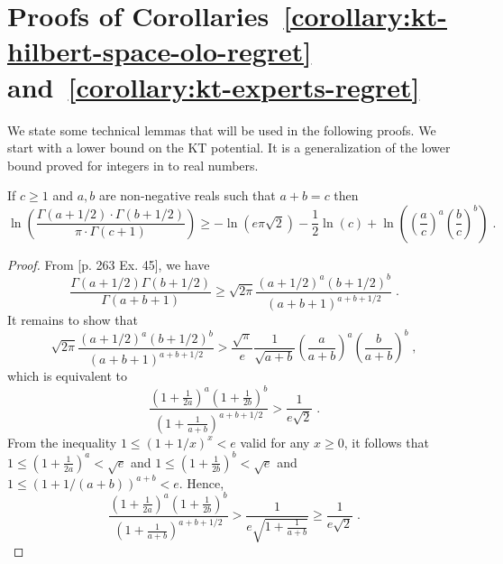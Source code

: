 \section{Proofs of Corollaries~\ref{corollary:kt-hilbert-space-olo-regret} and~\ref{corollary:kt-experts-regret}}
\label{section:corollaries_reductions}

We state some technical lemmas that will be used in the following proofs. We
start with a lower bound on the \ac{KT} potential. It is a generalization of the
lower bound proved for integers in \citet{WillemsST95} to real numbers.

\begin{lemma}
\label{lemma:approx_gamma_real}
If $c \ge 1$ and $a,b$ are non-negative reals such that $a + b = c$ then
\[
\ln \left(\frac{\Gamma(a + 1/2) \cdot \Gamma(b + 1/2)}{\pi \cdot \Gamma(c+1)} \right)
\ge - \ln(e \pi \sqrt{2}) -\frac{1}{2} \ln(c) +\ln \left(\left( \frac{a}{c} \right)^a \left( \frac{b}{c} \right)^b\right) \; .
\]
\end{lemma}
%
\begin{proof}
From \cite{WhittakerW27}[p. 263 Ex. 45], we have
\[
\frac{\Gamma(a+1/2)\Gamma(b+1/2)}{\Gamma(a+b+1)} \ge \sqrt{2\pi} \frac{(a+1/2)^a (b+1/2)^b}{(a+b+1)^{a+b+1/2}} \; .
\]
It remains to show that
\[
\sqrt{2\pi} \frac{(a+1/2)^a (b+1/2)^b}{(a+b+1)^{a+b+1/2}} > \frac{\sqrt{\pi}}{e} \frac{1}{\sqrt{a+b}} \left( \frac{a}{a+b} \right)^a \left( \frac{b}{a+b} \right)^b \; ,
\]
which is equivalent to
\[
\frac{(1+\frac{1}{2a})^a (1+\frac{1}{2b})^b}{(1+\frac{1}{a+b})^{a+b+1/2}} > \frac{1}{e\sqrt{2}} \; .
\]
From the inequality $1 \le (1+1/x)^x < e$ valid for any $x \ge 0$, it follows
that $1 \le (1+\frac{1}{2a})^a < \sqrt{e}$ and $1 \le (1+\frac{1}{2b})^b < \sqrt{e}$
and $1 \le (1+1/(a+b))^{a+b} < e$. Hence,
\[
\frac{(1+\frac{1}{2a})^a (1+\frac{1}{2b})^b}{(1+\frac{1}{a+b})^{a+b+1/2}}
> \frac{1}{e \sqrt{1 + \frac{1}{a+b}}}
\ge \frac{1}{e \sqrt{2}} \; .
\]
\end{proof}


